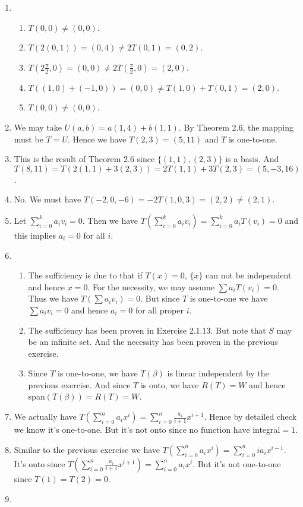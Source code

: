 \begin{enumerate}
\item \begin{enumerate}
\item $T(0,0)\neq (0,0)$.
\item $T(2(0,1))=(0,4)\neq 2T(0,1)=(0,2)$.
\item $T(2\frac{\pi}{2},0)=(0,0)\neq 2T(\frac{\pi}{2},0)=(2,0)$.
\item $T((1,0)+(-1,0))=(0,0)\neq T(1,0)+T(0,1)=(2,0)$.
\item $T(0,0)\neq (0,0)$.
\end{enumerate}
\item We may take $U(a,b)=a(1,4)+b(1,1)$. By Theorem 2.6, the mapping must be $T=U$. Hence we have $T(2,3)=(5,11)$ and $T$ is one-to-one.
\item This is the result of Theorem 2.6 since $\{(1,1),(2,3)\}$ is a basis. And $T(8,11)=T(2(1,1)+3(2,3))=2T(1,1)+3T(2,3)=(5,-3,16)$.
\item No. We must have $T(-2,0,-6)=-2T(1,0,3)=(2,2)\neq (2,1)$.
\item Let $\sum_{i=0}^k{a_iv_i}=0$. Then we have $T(\sum_{i=0}^k{a_iv_i})=\sum_{i=0}^k{a_iT(v_i)}=0$ and this implies $a_i=0$ for all $i$.
\item \begin{enumerate}
\item The sufficiency is due to that if $T(x)=0$, $\{x\}$ can not be independent and hence $x=0$. For the necessity, we may assume $\sum{a_iT(v_i)}=0$. Thus we have $T(\sum{a_iv_i})=0$. But since $T$ is one-to-one we have $\sum{a_iv_i}=0$ and hence $a_i=0$ for all proper $i$.
\item The sufficiency has been proven in Exercise 2.1.13. But note that $S$ may be an infinite set. And the necessity has been proven in the previous exercise.
\item Since $T$ is one-to-one, we have $T(\beta )$ is linear independent by the previous exercise. And since $T$ is onto, we have $R(T)=W$ and hence span$(T(\beta ))=R(T)=W$.
\end{enumerate}
\item We actually have $T(\sum_{i=0}^n{a_ix^i})=\sum_{i=0}^n{\frac{a_i}{i+1}x^{i+1}}$. Hence by detailed check we know it's one-to-one. But it's not onto since no function have integral$=1$.
\item Similar to the previous exercise we have $T(\sum_{i=0}^n{a_ix^i})=\sum_{i=0}^n{ia_ix^{i-1}}$. It's onto since $T(\sum_{i=0}^n{\frac{a_i}{i+1}x^{i+1}})=\sum_{i=0}^n{a_ix^i}$. But it's not one-to-one since $T(1)=T(2)=0$.
\item \begin{enumerate}

\end{enumerate}
\end{enumerate}
